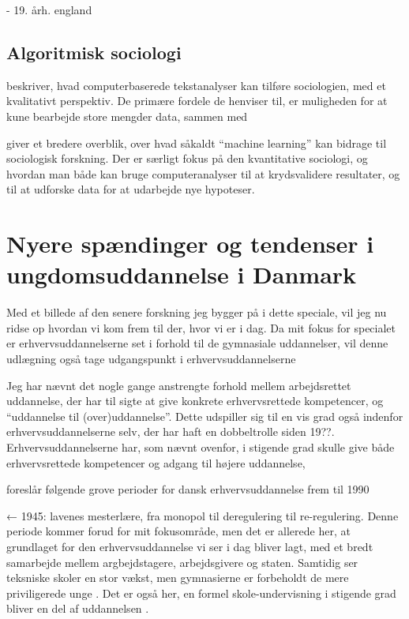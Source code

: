 - 19. årh. england

\section{Algoritmisk sociologi}\label{sec:review-compsoc}

\cite{evansMachineTranslationMining2016} beskriver, hvad computerbaserede tekstanalyser kan tilføre sociologien, med et kvalitativt perspektiv.
De primære fordele de henviser til, er muligheden for at kune bearbejde store mengder data, sammen med 

 \cite{molinaMachineLearningSociology2019} giver et bredere overblik, over hvad såkaldt “machine learning” kan bidrage til sociologisk forskning.
Der er særligt fokus på den kvantitative sociologi, og hvordan man både kan bruge computeranalyser til at krydsvalidere resultater, og til at udforske data for at udarbejde nye hypoteser.

\chapter{Nyere spændinger og tendenser i ungdomsuddannelse i Danmark}

Med et billede af den senere forskning jeg bygger på i dette speciale, vil jeg nu ridse op hvordan vi kom frem til der, hvor vi er i dag.
Da mit fokus for specialet er erhvervsuddannelserne set i forhold til de gymnasiale uddannelser, vil denne udlægning også tage udgangspunkt i erhvervsuddannelserne

Jeg har nævnt det nogle gange anstrengte forhold mellem arbejdsrettet uddannelse, der har til sigte at give konkrete erhvervsrettede kompetencer, og “uddannelse til (over)uddannelse”.
Dette udspiller sig til en vis grad også indenfor erhvervsuddannelserne selv, der har haft en dobbeltrolle siden 19??.
Erhvervsuddannelserne har, som nævnt ovenfor, i stigende grad skulle give både erhvervsrettede kompetencer og adgang til højere uddannelse,

\citeauthor{bondergaardHistoricalEmergenceKey2014} foreslår følgende grove perioder for dansk erhvervsuddannelse frem til 1990 \autocite[s. 7f]{bondergaardHistoricalEmergenceKey2014}

← 1945:  lavenes mesterlære, fra monopol til deregulering til re-regulering.
Denne periode kommer forud for mit fokusområde, men det er allerede her, at grundlaget for den erhvervsuddannelse vi ser i dag bliver lagt, med et bredt samarbejde mellem argbejdstagere, arbejdsgivere og staten.
Samtidig ser teksniske skoler en stor vækst, men gymnasierne er forbeholdt de mere priviligerede unge \autocite[s. 9]{bondergaardHistoricalEmergenceKey2014}.
Det er også her, en formel skole-undervisning i stigende grad bliver en del af uddannelsen \autocite[s. 15ff]{bondergaardHistoricalEmergenceKey2014}. 

